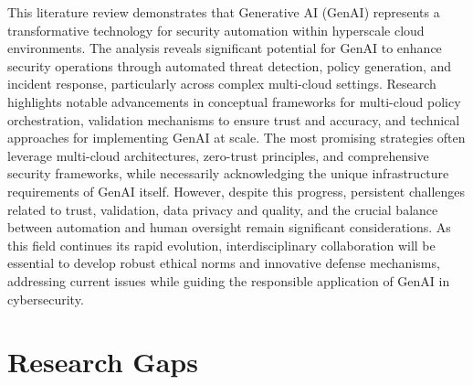 This literature review demonstrates that Generative AI (GenAI) represents a transformative technology for security automation within hyperscale cloud environments. The analysis reveals significant potential for GenAI to enhance security operations through automated threat detection, policy generation, and incident response, particularly across complex multi-cloud settings. Research highlights notable advancements in conceptual frameworks for multi-cloud policy orchestration, validation mechanisms to ensure trust and accuracy, and technical approaches for implementing GenAI at scale. The most promising strategies often leverage multi-cloud architectures, zero-trust principles, and comprehensive security frameworks, while necessarily acknowledging the unique infrastructure requirements of GenAI itself. However, despite this progress, persistent challenges related to trust, validation, data privacy and quality, and the crucial balance between automation and human oversight remain significant considerations. As this field continues its rapid evolution, interdisciplinary collaboration will be essential to develop robust ethical norms and innovative defense mechanisms, addressing current issues while guiding the responsible application of GenAI in cybersecurity.



\section{Research Gaps} %
\label{sec:Research Gaps}







